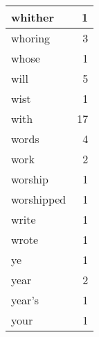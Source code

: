 \begin{center}
\begin{longtable}{l|r}
whither & 1 \\ \hline
whoring & 3 \\ \hline
whose & 1 \\ \hline
will & 5 \\ \hline
wist & 1 \\ \hline
with & 17 \\ \hline
words & 4 \\ \hline
work & 2 \\ \hline
worship & 1 \\ \hline
worshipped & 1 \\ \hline
write & 1 \\ \hline
wrote & 1 \\ \hline
ye & 1 \\ \hline
year & 2 \\ \hline
year's & 1 \\ \hline
your & 1 \\ \hline
\end{longtable}
\end{center}



\normalsize



